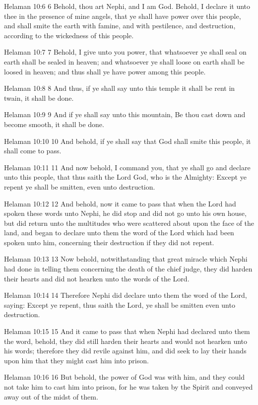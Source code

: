 Helaman 10:6
 6 Behold, thou art Nephi, and I am God. Behold, I declare it
unto thee in the presence of mine angels, that ye shall have
power over this people, and shall smite the earth with famine,
and with pestilence, and destruction, according to the wickedness
of this people.

Helaman 10:7
 7 Behold, I give unto you power, that whatsoever ye shall seal
on earth shall be sealed in heaven; and whatsoever ye shall loose
on earth shall be loosed in heaven; and thus shall ye have power
among this people.

Helaman 10:8
 8 And thus, if ye shall say unto this temple it shall be rent in
twain, it shall be done.

Helaman 10:9
 9 And if ye shall say unto this mountain, Be thou cast down and
become smooth, it shall be done.

Helaman 10:10
 10 And behold, if ye shall say that God shall smite this people,
it shall come to pass.

Helaman 10:11
 11 And now behold, I command you, that ye shall go and declare
unto this people, that thus saith the Lord God, who is the
Almighty: Except ye repent ye shall be smitten, even unto
destruction.

Helaman 10:12
 12 And behold, now it came to pass that when the Lord had spoken
these words unto Nephi, he did stop and did not go unto his own
house, but did return unto the multitudes who were scattered
about upon the face of the land, and began to declare unto them
the word of the Lord which had been spoken unto him, concerning
their destruction if they did not repent.

Helaman 10:13
 13 Now behold, notwithstanding that great miracle which Nephi
had done in telling them concerning the death of the chief judge,
they did harden their hearts and did not hearken unto the words
of the Lord.

Helaman 10:14
 14 Therefore Nephi did declare unto them the word of the Lord,
saying: Except ye repent, thus saith the Lord, ye shall be
smitten even unto destruction.

Helaman 10:15
 15 And it came to pass that when Nephi had declared unto them
the word, behold, they did still harden their hearts and would
not hearken unto his words; therefore they did revile against
him, and did seek to lay their hands upon him that they might
cast him into prison.

Helaman 10:16
 16 But behold, the power of God was with him, and they could not
take him to cast him into prison, for he was taken by the Spirit
and conveyed away out of the midst of them.

